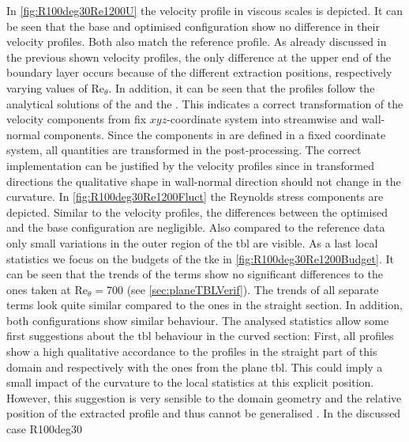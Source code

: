 In \autoref{fig:R100deg30Re1200U} the velocity profile in viscous scales is depicted.
It can be seen that the base and optimised configuration show no difference in their velocity profiles.
Both also match the reference profile.
As already discussed in the previous shown velocity profiles, the only difference at the upper end of the boundary layer occurs because of the different extraction positions, respectively varying values of $\mathrm{Re}_{\theta}$. 
In addition, it can be seen that the profiles follow the analytical solutions of the  and the .
This indicates a correct transformation of the velocity components from fix $xyz$-coordinate system into streamwise and wall-normal components. 
Since the components in  are defined in a fixed coordinate system, all quantities are transformed in the post-processing.
The correct implementation can be justified by the velocity profiles since in transformed directions the qualitative shape in wall-normal direction should not change in the curvature.
In \autoref{fig:R100deg30Re1200Fluct} the Reynolds stress components are depicted.
Similar to the velocity profiles, the differences between the optimised and the base configuration are negligible.
Also compared to the reference data only small variations in the outer region of the \acrshort{tbl} are visible.
As a last local statistics we focus on the budgets of the \acrshort{tke} in \autoref{fig:R100deg30Re1200Budget}.
It can be seen that the trends of the terms show no significant differences to the ones taken at $\mathrm{Re}_{\theta} = 700$ (see \autoref{sec:planeTBLVerif}).
The trends of all separate terms look quite similar compared to the ones in the straight section. 
In addition, both configurations show similar behaviour.
The analysed statistics allow some first suggestions about the \acrshort{tbl} behaviour in the curved section:
First, all profiles show a high qualitative accordance to the profiles in the straight part of this domain and respectively with the ones from the plane \acrshort{tbl}.
This could imply a small impact of the curvature to the local statistics at this explicit position.
However, this suggestion is very sensible to the domain geometry and the relative position of the extracted profile and thus cannot be generalised \citep{patel_longitudinal_1997}.
In the discussed case R100deg30 

